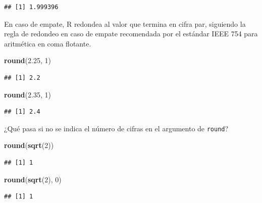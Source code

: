 \documentclass[]{book}
\newenvironment{Shaded}{\begin{snugshade}}{\end{snugshade}}
\newcommand{\DecValTok}[1]{\textcolor[rgb]{0.00,0.00,0.81}{#1}}
\newcommand{\FloatTok}[1]{\textcolor[rgb]{0.00,0.00,0.81}{#1}}
\newcommand{\KeywordTok}[1]{\textcolor[rgb]{0.13,0.29,0.53}{\textbf{#1}}}
\newcommand{\NormalTok}[1]{#1}
\theoremstyle{definition}
\theoremstyle{definition}
\theoremstyle{definition}
\theoremstyle{remark}
\begin{document}
\begin{verbatim}
## [1] 1.999396
\end{verbatim}

En caso de empate, R redondea al valor que termina en cifra par, siguiendo la regla de redondeo en caso de empate recomendada por el estándar IEEE 754 para aritmética en coma flotante.

\begin{Shaded}
\begin{Highlighting}[]
\KeywordTok{round}\NormalTok{(}\FloatTok{2.25}\NormalTok{, }\DecValTok{1}\NormalTok{)}
\end{Highlighting}
\end{Shaded}

\begin{verbatim}
## [1] 2.2
\end{verbatim}

\begin{Shaded}
\begin{Highlighting}[]
\KeywordTok{round}\NormalTok{(}\FloatTok{2.35}\NormalTok{, }\DecValTok{1}\NormalTok{)  }
\end{Highlighting}
\end{Shaded}

\begin{verbatim}
## [1] 2.4
\end{verbatim}

¿Qué pasa si no se indica el número de cifras en el argumento de \texttt{round}?

\begin{Shaded}
\begin{Highlighting}[]
\KeywordTok{round}\NormalTok{(}\KeywordTok{sqrt}\NormalTok{(}\DecValTok{2}\NormalTok{)) }
\end{Highlighting}
\end{Shaded}

\begin{verbatim}
## [1] 1
\end{verbatim}

\begin{Shaded}
\begin{Highlighting}[]
\KeywordTok{round}\NormalTok{(}\KeywordTok{sqrt}\NormalTok{(}\DecValTok{2}\NormalTok{), }\DecValTok{0}\NormalTok{) }
\end{Highlighting}
\end{Shaded}

\begin{verbatim}
## [1] 1
\end{verbatim}
\end{document}
